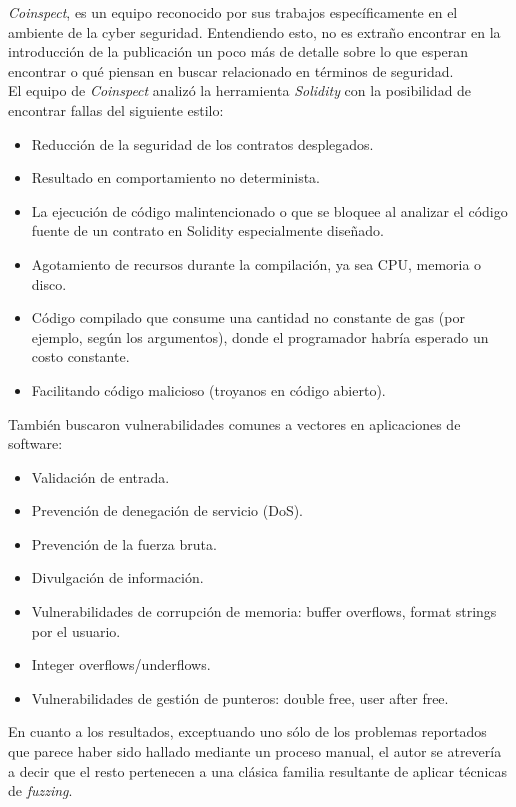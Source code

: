 \textit{Coinspect}, es un equipo reconocido por sus trabajos específicamente en el ambiente de la cyber seguridad. Entendiendo esto, no es extraño encontrar en la introducción de la publicación\cite{SolidityCompilerAuditReport} un poco más de detalle\cite{SummaryCoinspectReport} sobre lo que esperan encontrar o qué piensan en buscar relacionado en términos de seguridad.\\

El equipo de \textit{Coinspect} analizó la herramienta \textit{Solidity} con la posibilidad de encontrar fallas del siguiente estilo:
\begin{itemize}
    \item Reducción de la seguridad de los contratos desplegados.
    \item Resultado en comportamiento no determinista.
    \item La ejecución de código malintencionado o que se bloquee al analizar el código fuente de un contrato en Solidity especialmente diseñado.
    \item Agotamiento de recursos durante la compilación, ya sea CPU, memoria o disco.
    \item Código compilado que consume una cantidad no constante de gas (por ejemplo, según los argumentos), donde el programador habría esperado un costo constante.
    \item Facilitando código malicioso (troyanos en código abierto).\newline
\end{itemize}

También buscaron vulnerabilidades comunes a vectores en aplicaciones de software:
\begin{itemize}
    \item Validación de entrada.
    \item Prevención de denegación de servicio (DoS).
    \item Prevención de la fuerza bruta.
    \item Divulgación de información.
    \item Vulnerabilidades de corrupción de memoria: buffer overflows, format strings por el usuario.
    \item Integer overflows/underflows.
    \item Vulnerabilidades de gestión de punteros: double free, user after free.
\end{itemize}


En cuanto a los resultados, exceptuando uno sólo de los problemas reportados que parece haber sido hallado mediante un proceso manual, el autor se atrevería a decir que el resto pertenecen a una clásica familia resultante de aplicar técnicas de \textit{fuzzing}.\\


